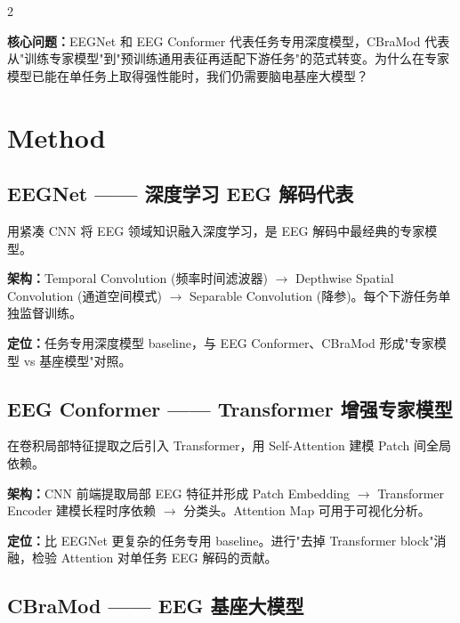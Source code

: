 \documentclass[12pt, a0paper]{article}
\begin{document}
\begin{multicols}{2}
\vspace{0.5em}

\textbf{核心问题：}EEGNet 和 EEG Conformer 代表任务专用深度模型，CBraMod 代表从"训练专家模型"到"预训练通用表征再适配下游任务"的范式转变。为什么在专家模型已能在单任务上取得强性能时，我们仍需要脑电基座大模型？

\section{Method}

\subsection{EEGNet —— 深度学习 EEG 解码代表}

用紧凑 CNN 将 EEG 领域知识融入深度学习，是 EEG 解码中最经典的专家模型。

\textbf{架构：}Temporal Convolution (频率时间滤波器) $\rightarrow$ Depthwise Spatial Convolution (通道空间模式) $\rightarrow$ Separable Convolution (降参)。每个下游任务单独监督训练。

\textbf{定位：}任务专用深度模型 baseline，与 EEG Conformer、CBraMod 形成"专家模型 vs 基座模型"对照。

\vspace{0.8em}

\subsection{EEG Conformer —— Transformer 增强专家模型}

在卷积局部特征提取之后引入 Transformer，用 Self-Attention 建模 Patch 间全局依赖。

\textbf{架构：}CNN 前端提取局部 EEG 特征并形成 Patch Embedding $\rightarrow$ Transformer Encoder 建模长程时序依赖 $\rightarrow$ 分类头。Attention Map 可用于可视化分析。

\textbf{定位：}比 EEGNet 更复杂的任务专用 baseline。进行"去掉 Transformer block"消融，检验 Attention 对单任务 EEG 解码的贡献。

\vspace{0.8em}

\subsection{CBraMod —— EEG 基座大模型}


\end{multicols}
\end{document}
